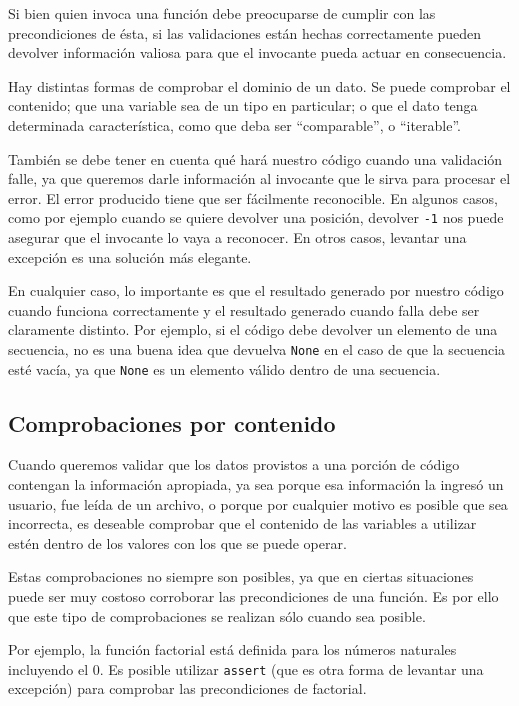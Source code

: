 Si bien quien invoca una función debe preocuparse de cumplir con las
precondiciones de ésta, si las validaciones están hechas correctamente pueden
devolver información valiosa para que el invocante pueda actuar en
consecuencia.

Hay distintas formas de comprobar el dominio de un dato. Se puede comprobar
el contenido; que una variable sea de un tipo en particular; o que el dato
tenga determinada característica, como que deba ser ``comparable'', o
``iterable''.

También se debe tener en cuenta qué hará nuestro código cuando una
validación falle, ya que queremos darle información al invocante que le sirva
para procesar el error. El error producido tiene que ser fácilmente
reconocible.  En algunos casos, como por ejemplo cuando se quiere devolver
una posición, devolver \lstinline!-1! nos puede asegurar que el invocante
lo vaya a reconocer. En otros casos, levantar una excepción es una solución
más elegante.

En cualquier caso, lo importante es que el resultado generado por nuestro
código cuando funciona correctamente y el resultado generado cuando falla
debe ser claramente distinto. Por ejemplo, si el código debe devolver un
elemento de una secuencia, no es una buena idea que devuelva
\lstinline!None! en el caso de que la secuencia esté vacía, ya que
\lstinline!None! es un elemento válido dentro de una secuencia.

\subsection{Comprobaciones por contenido}

Cuando queremos validar que los datos provistos a una porción de código
contengan la información apropiada, ya sea porque esa información la ingresó
un usuario, fue leída de un archivo, o porque por cualquier motivo es posible
que sea incorrecta, es deseable comprobar que el contenido de las variables a
utilizar estén dentro de los valores con los que se puede operar.

Estas comprobaciones no siempre son posibles, ya que en ciertas situaciones
puede ser muy costoso corroborar las precondiciones de una función. Es por
ello que este tipo de comprobaciones se realizan sólo cuando sea posible.

Por ejemplo, la función factorial está definida para los números naturales
incluyendo el 0. Es posible utilizar \lstinline!assert! (que es otra forma de
levantar una excepción) para comprobar las precondiciones de factorial.

